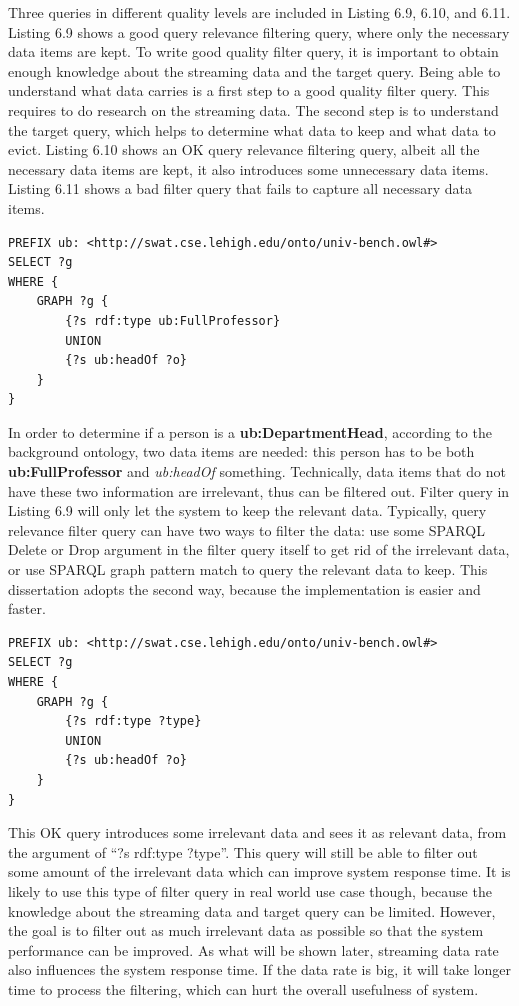 Three queries in different quality levels are included in Listing 6.9, 6.10, and 6.11.
Listing 6.9 shows a good query relevance filtering query, where only the necessary data items are kept.
To write good quality filter query, it is important to obtain enough knowledge about the streaming data and the target query. 
Being able to understand what data carries is a first step to a good quality filter query.
This requires to do research on the streaming data. 
The second step is to understand the target query, which helps to determine what data to keep and what data to evict. 
Listing 6.10 shows an OK query relevance filtering query, albeit all the necessary data items are kept, it also introduces some unnecessary data items.
Listing 6.11 shows a bad filter query that fails to capture all necessary data items.

\begin{lstlisting}[language=SPARQL,caption={Good Query Relevance Filtering Query},basicstyle=\small,frame=single]
PREFIX ub: <http://swat.cse.lehigh.edu/onto/univ-bench.owl#>
SELECT ?g
WHERE {
    GRAPH ?g {
        {?s rdf:type ub:FullProfessor}
        UNION
    	{?s ub:headOf ?o}  
    }
}
\end{lstlisting}

In order to determine if a person is a \textbf{ub:DepartmentHead}, according to the background ontology, two data items are needed: this person has to be both \textbf{ub:FullProfessor} and \textit{ub:headOf} something.
Technically, data items that do not have these two information are irrelevant, thus can be filtered out. 
Filter query in Listing 6.9 will only let the system to keep the relevant data.
Typically, query relevance filter query can have two ways to filter the data: use some SPARQL Delete or Drop argument in the filter query itself to get rid of the irrelevant data, or use SPARQL graph pattern match to query the relevant data to keep. 
This dissertation adopts the second way, because the implementation is easier and faster.

\begin{lstlisting}[language=SPARQL,caption={OK Query Relevance Filtering Query},basicstyle=\small,frame=single]
PREFIX ub: <http://swat.cse.lehigh.edu/onto/univ-bench.owl#>
SELECT ?g
WHERE { 
    GRAPH ?g {
        {?s rdf:type ?type}
        UNION 
        {?s ub:headOf ?o}  
    }
}
\end{lstlisting}

This OK query introduces some irrelevant data and sees it as relevant data, from the argument of ``?s rdf:type ?type''.
This query will still be able to filter out some amount of the irrelevant data which can improve system response time.
It is likely to use this type of filter query in real world use case though, because the knowledge about the streaming data and target query can be limited. 
However, the goal is to filter out as much irrelevant data as possible so that the system performance can be improved.
As what will be shown later, streaming data rate also influences the system response time. 
If the data rate is big, it will take longer time to process the filtering, which can hurt the overall usefulness of system.


